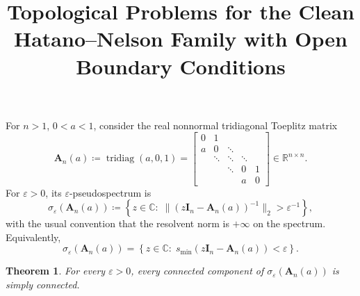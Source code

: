 \documentclass[11pt]{article}
\title{Topological Problems for the Clean Hatano--Nelson Family with Open Boundary Conditions}
\author{}
\date{}
\newtheorem{theorem}{Theorem}
\begin{document}
\maketitle

For \(n>1\), \(0<a<1\), consider the real nonnormal tridiagonal Toeplitz matrix
\[
\mathbf A_n(a)\coloneqq\operatorname{tridiag}(a,0,1)
=
\begin{bmatrix}
0 & 1 \\
a & 0 & \ddots \\
& \ddots & \ddots & \ddots \\
&& \ddots & 0 & 1 \\
&&& a & 0
\end{bmatrix}\in \mathbb{R}^{n\times n}.
\]
For \(\varepsilon>0\), its \(\varepsilon\)-pseudospectrum is
\[
\sigma_\varepsilon(\mathbf A_n(a))
\coloneqq
\left\{
z\in\mathbb C:\;
\|(z\mathbf I_n-\mathbf A_n(a))^{-1}\|_2>\varepsilon^{-1}
\right\},
\]
with the usual convention that the resolvent norm is \(+\infty\) on the spectrum. Equivalently,
\[
\sigma_\varepsilon(\mathbf A_n(a))
=
\left\{
z\in\mathbb C:\;
s_{\min}(z\mathbf I_n-\mathbf A_n(a))<\varepsilon
\right\}.
\]

\begin{theorem}\label{thm:components-simply-connected}
For every \(\varepsilon>0\), every connected component of
\(\sigma_\varepsilon(\mathbf A_n(a))\)
is simply connected.
\end{theorem}
\end{document}

